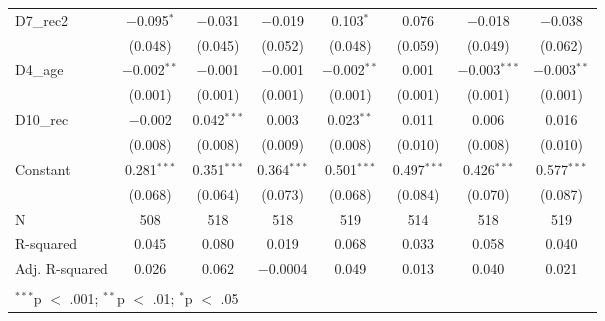 \documentclass[
]{article}
\begin{document}
\begin{table}[!htbp]
\begin{tabular}{@{\extracolsep{5pt}}lccccccc}
  D7\_rec2 & $-$0.095$^{*}$ & $-$0.031 & $-$0.019 & 0.103$^{*}$ & 0.076 & $-$0.018 & $-$0.038 \\ 
  & (0.048) & (0.045) & (0.052) & (0.048) & (0.059) & (0.049) & (0.062) \\ 
  D4\_age & $-$0.002$^{**}$ & $-$0.001 & $-$0.001 & $-$0.002$^{**}$ & 0.001 & $-$0.003$^{***}$ & $-$0.003$^{**}$ \\ 
  & (0.001) & (0.001) & (0.001) & (0.001) & (0.001) & (0.001) & (0.001) \\ 
  D10\_rec & $-$0.002 & 0.042$^{***}$ & 0.003 & 0.023$^{**}$ & 0.011 & 0.006 & 0.016 \\ 
  & (0.008) & (0.008) & (0.009) & (0.008) & (0.010) & (0.008) & (0.010) \\ 
  Constant & 0.281$^{***}$ & 0.351$^{***}$ & 0.364$^{***}$ & 0.501$^{***}$ & 0.497$^{***}$ & 0.426$^{***}$ & 0.577$^{***}$ \\ 
  & (0.068) & (0.064) & (0.073) & (0.068) & (0.084) & (0.070) & (0.087) \\ 
 N & 508 & 518 & 518 & 519 & 514 & 518 & 519 \\ 
R-squared & 0.045 & 0.080 & 0.019 & 0.068 & 0.033 & 0.058 & 0.040 \\ 
Adj. R-squared & 0.026 & 0.062 & $-$0.0004 & 0.049 & 0.013 & 0.040 & 0.021 \\ 
\hline \\[-1.8ex] 
\multicolumn{8}{l}{$^{***}$p $<$ .001; $^{**}$p $<$ .01; $^{*}$p $<$ .05} \\ 
\end{tabular} 
\end{table}
\end{document}

